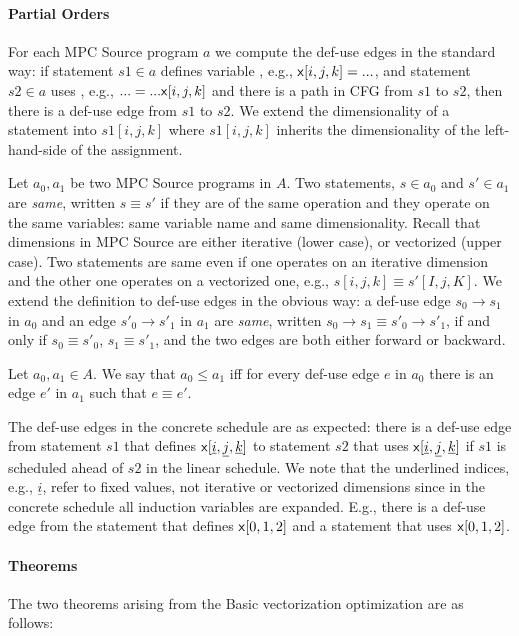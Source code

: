 \paragraph{Partial Orders}

For each MPC Source program $a$ we compute the def-use edges in the standard way: if statement $s1 \in a$ defines variable \x, e.g., ${\sf {x}}[i,j,k] = ...$, 
and statement $s2 \in a$ uses \x, e.g., $... = ... {\sf {x}}[i,j,k]$ and there is a path in CFG from $s1$ to $s2$, then there is a def-use edge from
 $s1$ to $s2$. We extend the dimensionality of a statement into $s1[i,j,k]$ where $s1[i,j,k]$ inherits the dimensionality of the left-hand-side of the assignment.
    
 Let $a_0, a_1$ be two MPC Source programs in $A$. 
 Two statements, $s \in a_0$ and $s' \in a_1$ are \emph{same}, written $s \equiv s'$ if they are of the same operation and they operate on 
 the same variables: same variable name and same dimensionality. Recall that dimensions in MPC Source are either iterative (lower case), or vectorized (upper case). 
 Two statements are same even if one operates on an iterative dimension and the other one operates on a vectorized one, e.g., $s[i,j,k] \equiv s'[I,j,K]$.
 We extend the definition to def-use edges in the obvious way: a def-use edge $s_0 \rightarrow s_1$ in $a_0$ and an edge $s'_0 \rightarrow s'_1$ in $a_1$
 are \emph{same}, written $s_0 \rightarrow s_1 \equiv s'_0 \rightarrow s'_1$, if and only if $s_0 \equiv s'_0$, $s_1 \equiv s'_1$, and the two edges are both either 
 forward or backward. 
  
\begin{definition} Let $a_0, a_1 \in A$. We say that $a_0 \le a_1$ iff for every def-use edge $e$ in $a_0$ there is an edge
$e'$ in $a_1$ such that $e \equiv e'$.
\end{definition}
 
 The def-use edges in the concrete schedule are as expected: there is a def-use edge from statement $s1$ that defines ${\sf {x}}[\underline{i},\underline{j},\underline{k}]$
 to statement $s2$ that uses ${\sf {x}}[\underline{i},\underline{j},\underline{k}]$ if $s1$ is scheduled ahead of $s2$ in the linear schedule. We note that the underlined
 indices, e.g., $\underline{i}$, refer to fixed values, not iterative or vectorized dimensions since in the concrete schedule all induction variables are expanded. 
 E.g., there is a def-use edge from the statement that defines ${\sf {x}}[0,1,2]$ and a statement that uses ${\sf {x}}[0,1,2]$.
 
\paragraph{Theorems} The two theorems arising from the Basic vectorization optimization are as follows: 

